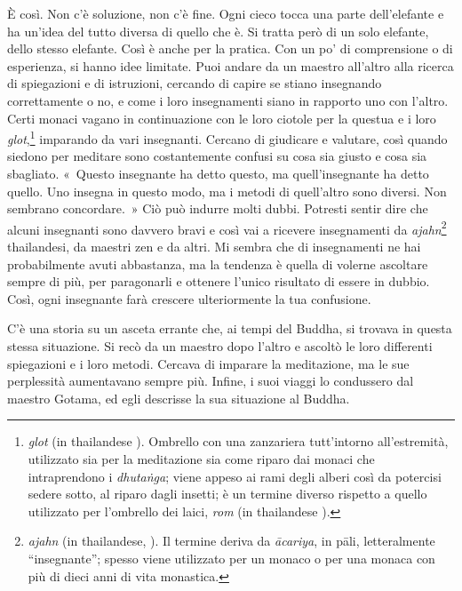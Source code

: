 È così. Non c'è soluzione, non c'è fine. Ogni cieco tocca una parte
dell'elefante e ha un'idea del tutto diversa di quello che è. Si tratta
però di un solo elefante, dello stesso elefante. Così è anche per la
pratica. Con un po' di comprensione o di esperienza, si hanno idee
limitate. Puoi andare da un maestro all'altro alla ricerca di
spiegazioni e di istruzioni, cercando di capire se stiano insegnando
correttamente o no, e come i loro insegnamenti siano in rapporto uno con
l'altro. Certi monaci vagano in continuazione con le loro ciotole per la
questua e i loro \emph{glot},\footnote{\emph{glot} (in thailandese ).
  Ombrello con una zanzariera tutt'intorno all'estremità, utilizzato sia
  per la meditazione sia come riparo dai monaci che intraprendono i
  \emph{dhutaṅga}; viene appeso ai rami degli alberi così da potercisi
  sedere sotto, al riparo dagli insetti; è un termine diverso rispetto a
  quello utilizzato per l'ombrello dei laici, \emph{rom} (in thailandese
  ).} imparando da vari insegnanti. Cercano di giudicare e valutare,
così quando siedono per meditare sono costantemente confusi su cosa sia
giusto e cosa sia sbagliato. «~Questo insegnante ha detto questo, ma
quell'insegnante ha detto quello. Uno insegna in questo modo, ma i
metodi di quell'altro sono diversi. Non sembrano concordare.~» Ciò può
indurre molti dubbi. Potresti sentir dire che alcuni insegnanti sono
davvero bravi e così vai a ricevere insegnamenti da
\emph{ajahn}\footnote{\emph{ajahn} (in thailandese, ).
  Il termine deriva da \emph{ācariya}, in pāli, letteralmente
  ``insegnante''; spesso viene utilizzato per un monaco o per una monaca
  con più di dieci anni di vita monastica.} thailandesi, da maestri zen
e da altri. Mi sembra che di insegnamenti ne hai probabilmente avuti
abbastanza, ma la tendenza è quella di volerne ascoltare sempre di più,
per paragonarli e ottenere l'unico risultato di essere in dubbio. Così,
ogni insegnante farà crescere ulteriormente la tua confusione.

C'è una storia su un asceta errante che, ai tempi del Buddha, si trovava
in questa stessa situazione. Si recò da un maestro dopo l'altro e
ascoltò le loro differenti spiegazioni e i loro metodi. Cercava di
imparare la meditazione, ma le sue perplessità aumentavano sempre più.
Infine, i suoi viaggi lo condussero dal maestro Gotama, ed egli
descrisse la sua situazione al Buddha.

